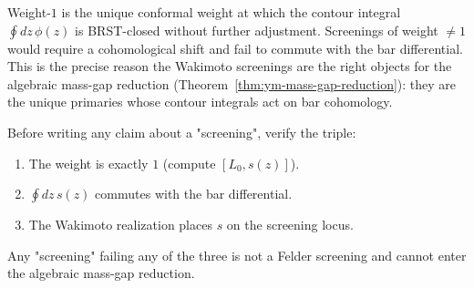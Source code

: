 \begin{remark}
\label{rem:weight-one-brst}
Weight-$1$ is the unique conformal weight at which the contour
integral $\oint dz\,\phi(z)$ is BRST-closed without further
adjustment. Screenings of weight $\neq 1$ would require a
cohomological shift and fail to commute with the bar
differential. This is the precise reason the Wakimoto screenings
are the right objects for the algebraic mass-gap reduction
(Theorem~\ref{thm:ym-mass-gap-reduction}): they are the unique
primaries whose contour integrals act on bar cohomology.
\end{remark}

\begin{remark}
\label{rem:screenings-first-principles-triple}
Before writing any claim about a "screening", verify the triple:
\begin{enumerate}[label=\textup{(\roman*)}]
\item The weight is exactly $1$ (compute $[L_0, s(z)]$).
\item $\oint dz\, s(z)$ commutes with the bar differential.
\item The Wakimoto realization places $s$ on the screening locus.
\end{enumerate}
Any "screening" failing any of the three is not a Felder screening
and cannot enter the algebraic mass-gap reduction.
\end{remark}

